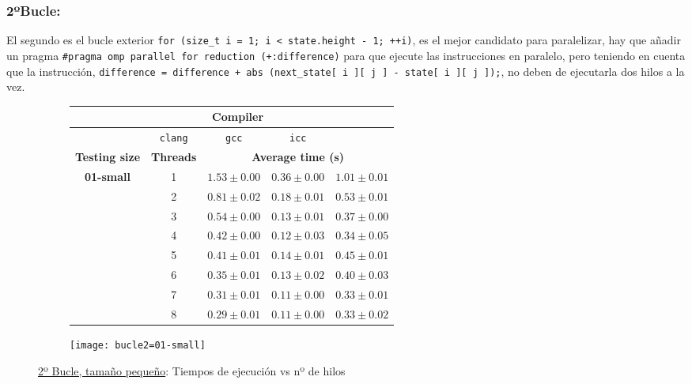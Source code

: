 
\subsubsection{\textbf{2ºBucle:} }

\par El segundo es el bucle exterior \texttt{for (size\_t i = 1; i < state.height - 1; ++i)}, es el mejor candidato para paralelizar, hay que añadir un
pragma \texttt{\#pragma omp parallel for reduction (+:difference)} para que ejecute las instrucciones en paralelo, pero teniendo en cuenta que la
instrucción, \texttt{difference = difference + abs (next\_state[ i ][ j ] - state[ i ][ j ]);}, no deben de ejecutarla dos hilos a la vez.

\begin{figure}[H]
    \centering
    \begin{subfigure}{0.4\textwidth}
        \begin{adjustbox}{width=\textwidth} 
        \begin{tabular}{|c|c|c|c|c|}
            \hline
            \rowcolor{azul} \multicolumn{2}{|c|}{}&\multicolumn{3}{c|}{\textbf{Compiler}} \\ \hline
            \rowcolor{azul} \multicolumn{2}{|c|}{}&\texttt{clang}&\texttt{gcc}&\texttt{icc}\\ \hline
            \rowcolor{azul} \textbf{Testing size} & \textbf{Threads}&\multicolumn{3}{c|}{\textbf{Average time (s)}} \\ \hline
            \multirow{8}{1cm}{\textbf{01-small}} & 1 & \(1.53\pm{0.00}\) & \(0.36\pm{0.00}\) & \(1.01\pm{0.01}\) \\ \cline{2-5}
            & 2 & \(0.81\pm{0.02}\) & \(0.18\pm{0.01}\) & \(0.53\pm{0.01}\) \\ \cline{2-5}
            & 3 & \(0.54\pm{0.00}\) & \(0.13\pm{0.01}\) & \(0.37\pm{0.00}\) \\ \cline{2-5}
            & 4 & \(0.42\pm{0.00}\) & \(0.12\pm{0.03}\) & \(0.34\pm{0.05}\) \\ \cline{2-5}
            & 5 & \(0.41\pm{0.01}\) & \(0.14\pm{0.01}\) & \(0.45\pm{0.01}\) \\ \cline{2-5}
            & 6 & \(0.35\pm{0.01}\) & \(0.13\pm{0.02}\) & \(0.40\pm{0.03}\) \\ \cline{2-5}
            & 7 & \(0.31\pm{0.01}\) & \(0.11\pm{0.00}\) & \(0.33\pm{0.01}\) \\ \cline{2-5}
            & 8 & \(0.29\pm{0.01}\) & \(0.11\pm{0.00}\) & \(0.33\pm{0.02}\) \\ \hline
        \end{tabular}
        \end{adjustbox}
    \end{subfigure}
    \hfill
    \begin{subfigure}{0.5\textwidth}
        \texttt{[image: bucle2=01-small]}
    \end{subfigure}
    \caption{\underline{2º Bucle, tamaño pequeño}: Tiempos de ejecución vs nº de hilos}
    \label{fig:bucle2=01-small}
\end{figure}

